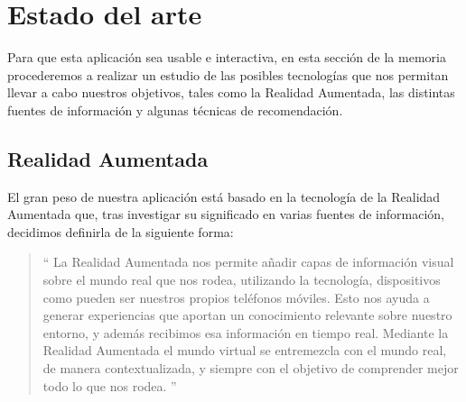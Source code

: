 
\cleardoublepage


\chapter{Estado del arte}
\label{makereference2}
Para que esta aplicación sea usable e interactiva, en esta sección de la memoria procederemos a 
realizar un estudio de las posibles tecnologías que nos permitan llevar a cabo nuestros objetivos, 
tales como la Realidad Aumentada, las distintas fuentes de información y algunas
técnicas de recomendación. 
\section{Realidad Aumentada}
\label{makereference2.1}
El gran peso de nuestra aplicación está basado en la tecnología de la Realidad Aumentada que, tras investigar su significado en varias fuentes de información,
decidimos definirla de la siguiente forma:
\begin{quote}
``
La Realidad Aumentada nos permite añadir capas de información visual sobre el 
mundo real que nos rodea, utilizando la tecnología, dispositivos como pueden ser 
nuestros propios teléfonos móviles. Esto nos ayuda a generar experiencias que aportan
un conocimiento relevante sobre nuestro entorno, y además recibimos esa información en 
tiempo real. Mediante la Realidad Aumentada el mundo virtual se entremezcla con el mundo 
real, de manera contextualizada, y siempre con el objetivo de comprender mejor todo lo que 
nos rodea.
''
\end{quote}


